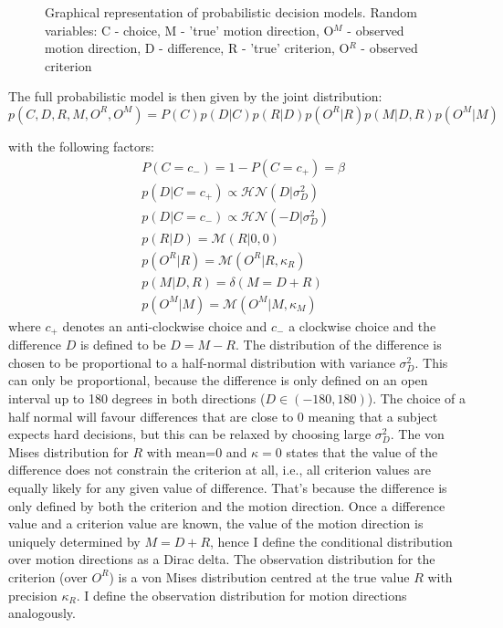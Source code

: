 \documentclass[10pt,a4paper]{article}
\begin{document}
\begin{figure}
    \centering
    \def\svgwidth{.5\columnwidth}
    
    \caption{Graphical representation of probabilistic decision models. Random variables: C - choice, M - 'true' motion direction, O$^M$ - observed motion direction, D - difference, R - 'true' criterion, O$^R$ - observed criterion}
    \label{fig:graphic_models}
\end{figure}

The full probabilistic model is then given by the joint distribution:
\begin{equation}\label{eq:joint_diff}
p(C, D, R, M, O^R, O^M) = P(C)p(D | C)p(R | D)p(O^R | R)p(M | D, R)p(O^M | M)
\end{equation}

with the following factors:
\begin{align}
&P(C = c_-) = 1 - P(C = c_+) = \beta\\
&p(D | C=c_+) \propto \mathcal{HN}(D | \sigma_D^2)\\
&p(D | C=c_-) \propto \mathcal{HN}(-D | \sigma_D^2)\\
&p(R | D) = \mathcal{M}(R | 0, 0)\\
&p(O^R | R) = \mathcal{M}(O^R | R, \kappa_{R})\\
&p(M | D, R) = \delta(M = D + R)\\
&p(O^M | M) = \mathcal{M}(O^M | M, \kappa_{M})
\end{align}
where $c_+$ denotes an anti-clockwise choice and $c_-$ a clockwise choice and the difference $D$ is defined to be $D = M - R$. The distribution of the difference is chosen to be proportional to a half-normal distribution with variance $\sigma_D^2$. This can only be proportional, because the difference is only defined on an open interval up to 180 degrees in both directions ($D \in (-180, 180)$). The choice of a half normal will favour differences that are close to 0 meaning that a subject expects hard decisions, but this can be relaxed by choosing large $\sigma_D^2$. The von Mises distribution for $R$ with mean=0 and $\kappa=0$ states that the value of the difference does not constrain the criterion at all, i.e., all criterion values are equally likely for any given value of difference. That's because the difference is only defined by both the criterion and the motion direction. Once a difference value and a criterion value are known, the value of the motion direction is uniquely determined by $M = D + R$, hence I define the conditional distribution over motion directions as a Dirac delta. The observation distribution for the criterion (over $O^R$) is a von Mises distribution centred at the true value $R$ with precision $\kappa_R$. I define the observation distribution for motion directions analogously.
\end{document}
